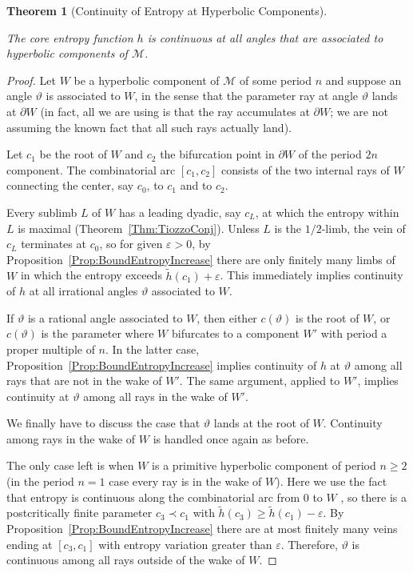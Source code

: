 \documentclass[12pt]{amsart}
\newcommand{\M}{\mathscr M}
\newcommand{\0}{\texttt{0}}
\newcommand{\1}{\texttt{1}}
\newcommand\eps{\varepsilon}
\newtheorem{theorem}{Theorem}[section]
\theoremstyle{definition}
\numberwithin{equation}{section}
\renewcommand{\theta}{\vartheta}
\newcommand{\lineclear}{\rule{0pt}{2pt}\newline}
\begin{document}
\begin{theorem}[Continuity of Entropy at Hyperbolic Components]
\label{Thm:ContEntropyHypComps} \lineclear
The core entropy function $h$ is continuous at all angles that are associated to hyperbolic components of $\M$.
\end{theorem}
\begin{proof}
Let $W$ be a hyperbolic component of $\M$ of some period $n$ and suppose an angle $\theta$ is associated to $W$, in the sense that the parameter ray at angle $\theta$ lands at $\partial W$ (in fact, all we are using is that the ray accumulates at $\partial W$; we are not assuming the known fact that all such rays actually land). 

Let $c_1$ be the root of $W$ and $c_2$ the bifurcation point in $\partial W$ of the period $2n$ component. The combinatorial arc $[c_1,c_2]$ consists of the two internal rays of $W$ connecting the center, say $c_0$, to $c_1$ and to $c_2$. 

Every sublimb $L$ of $W$ has a leading dyadic, say $c_L$, at which the entropy within $L$ is maximal (Theorem~\ref{Thm:TiozzoConj}). Unless $L$ is the $1/2$-limb, the vein of $c_L$ terminates at $c_0$, so for given $\eps>0$, by Proposition~\ref{Prop:BoundEntropyIncrease} there are only finitely many limbs of $W$ in which the entropy exceeds $\tilde h(c_1)+\eps$. This immediately implies continuity of $h$ at all irrational angles $\theta$ associated to $W$. 

If $\theta$ is a rational angle associated to $W$, then either $c(\theta)$ is the root of $W$, or $c(\theta)$ is the parameter where $W$ bifurcates to a component $W'$ with period a proper multiple of $n$. In the latter case,  Proposition~\ref{Prop:BoundEntropyIncrease} implies continuity of $h$ at $\theta$ among all rays that are not in the wake of $W'$. The same argument, applied to $W'$, implies continuity at $\theta$ among all rays in the wake of $W'$. 

We finally have to discuss the case that $\theta$ lands at the root of $W$. Continuity among rays in the wake of $W$ is handled once again as before. 

The only case left is when $W$ is a primitive hyperbolic component of period $n\ge 2$ (in the period $n=1$ case every ray is in the wake of $W$). Here we use the fact that entropy is continuous along the combinatorial arc from $0$ to $W$ \cite[Theorem~4.9]{Jung}, so there is a postcritically finite parameter $c_3\prec c_1$ with $\tilde h(c_3)\ge \tilde h(c_1)-\eps$. By Proposition~\ref{Prop:BoundEntropyIncrease} there are at most finitely many veins ending at $[c_3,c_1]$ with entropy variation greater than $\eps$. Therefore, $\theta$ is continuous among all rays outside of the wake of $W$.
\end{proof}
\end{document}
